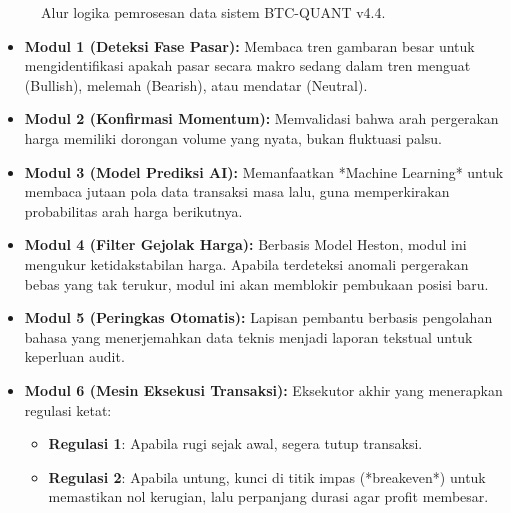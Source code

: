\documentclass[a4paper,11pt]{article}
\begin{document}
\begin{figure}[h!]
\centering
{}
\caption{Alur logika pemrosesan data sistem BTC-QUANT v4.4.}
\end{figure}

\begin{itemize}
    \item \textbf{Modul 1 (Deteksi Fase Pasar):} Membaca tren gambaran besar untuk mengidentifikasi apakah pasar secara makro sedang dalam tren menguat (Bullish), melemah (Bearish), atau mendatar (Neutral).
    \item \textbf{Modul 2 (Konfirmasi Momentum):} Memvalidasi bahwa arah pergerakan harga memiliki dorongan volume yang nyata, bukan fluktuasi palsu.
    \item \textbf{Modul 3 (Model Prediksi AI):} Memanfaatkan *Machine Learning* untuk membaca jutaan pola data transaksi masa lalu, guna memperkirakan probabilitas arah harga berikutnya.
    \item \textbf{Modul 4 (Filter Gejolak Harga):} Berbasis Model Heston, modul ini mengukur ketidakstabilan harga. Apabila terdeteksi anomali pergerakan bebas yang tak terukur, modul ini akan memblokir pembukaan posisi baru.
    \item \textbf{Modul 5 (Peringkas Otomatis):} Lapisan pembantu berbasis pengolahan bahasa yang menerjemahkan data teknis menjadi laporan tekstual untuk keperluan audit.
    \item \textbf{Modul 6 (Mesin Eksekusi Transaksi):} Eksekutor akhir yang menerapkan regulasi ketat:
    \begin{itemize}
        \item \textbf{Regulasi 1}: Apabila rugi sejak awal, segera tutup transaksi.
        \item \textbf{Regulasi 2}: Apabila untung, kunci di titik impas (*breakeven*) untuk memastikan nol kerugian, lalu perpanjang durasi agar profit membesar.
    \end{itemize}
\end{itemize}
\end{document}
